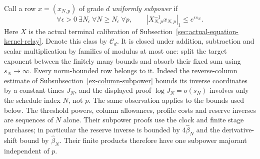 Call a row $x=(x_{N,p})$ of grade $d$ \emph{uniformly subpower} if
\[
 \forall\epsilon>0\ \exists N_\epsilon\ \forall N\ge N_\epsilon\
 \forall p,\qquad |X_{N,p}^{-1}x_{N,p}|_1\le e^{\epsilon s_N}.
\]
Here $X$ is the actual terminal calibration of
Subsection~\ref{sec:actual-equation-kernel-relay}. Denote this class by
$\mathscr C_d$. It is closed under addition, subtraction and scalar
multiplication by families of modulus at most one: split the target
exponent between the finitely many bounds and absorb their fixed sum
using $s_N\to\infty$. Every norm-bounded row belongs to it. Indeed the
reverse-column estimate of Subsubsection~\ref{ex-column-subpower} bounds its
inverse coordinates by a constant times $J_N$, and the displayed
proof $\log J_N=o(s_N)$ involves only the schedule index $N$, not $p$.
The same observation applies to the bounds used below. The threshold
powers, column allowances, profile costs and reserve inverses are
sequences of $N$ alone. Their subpower proofs use the clock and finite
stage purchases; in particular the reserve inverse is bounded by
$4\widehat\beta_N$ and the derivative-shift bound by
$\widehat\beta_N$. Their finite products therefore have one subpower
majorant independent of $p$.

